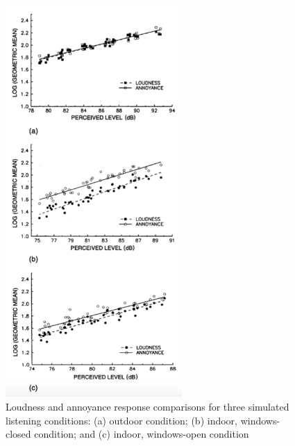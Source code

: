 \documentclass[]{aiaa-tc}%
\begin{document}
\begin{figure}[tb!]
  \centering
  \includegraphics[width=0.6\textwidth]{figs/simulated-comparisons.png}
  \caption{Loudness and annoyance response comparisons for three simulated listening conditions: (a) outdoor condition; (b) indoor, windows-closed condition; and (c) indoor, windows-open condition~\cite{leatherwood2002summary}}
  \label{fig:simulated-comparisons}
\end{figure}



\end{document}
